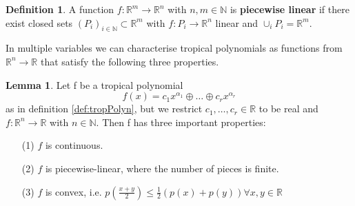 \documentclass{article}
\theoremstyle{definition}
\newtheorem{lemma}[theorem]{Lemma}
\newtheorem{definition}[theorem]{Definition}
\begin{document}
\begin{definition}
A function $f : \mathbb{R}^{m} \to \mathbb{R}^{n}$ with $n, m \in \mathbb{N}$ is \textbf{piecewise linear} if there exist closed sets $(P_{i})_{i \in \mathbb{N}} \subset \mathbb{R}^{m}$ with $f : P_{i} \to \mathbb{R}^{n}$ linear and $\cup_{i}P_{i} = \mathbb{R}^{m}$.
\end{definition}

In multiple variables we can characterise tropical polynomials as functions from $\mathbb{R}^{n} \to \mathbb{R}$ that satisfy the following three properties.

\begin{lemma}\hspace{1sp}\cite{maclagan2015introduction}\label{lemma:trop_properties}
Let f be a tropical polynomial
$$ f(x) = c_1 x^{\alpha_1} \oplus \dots \oplus c_r x^{\alpha_r}$$ as in definition \ref{def:tropPolyn}, but we restrict $c_1, \dots , c_r \in \mathbb{R}$ to be real and $f: \mathbb{R}^{n} \to \mathbb{R}$ with $n \in \mathbb{N}$. Then f has three important properties:
\begin{itemize}
\item[(1)]
$f$ is continuous.
\item[(2)]
$f$ is piecewise-linear, where the number of pieces is finite.
\item[(3)]
$f$ is convex, i.e. $p(\frac{x + y}{2}) \leq \frac{1}{2}(p(x)+p(y)) \forall x,y \in \mathbb{R}$
\end{itemize}
\end{lemma}
\end{document}
